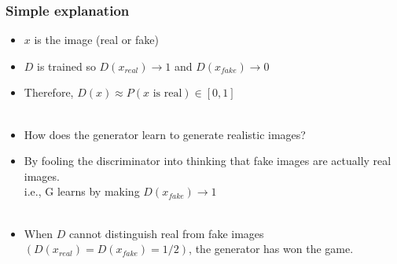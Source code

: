 \documentclass[t]{beamer}
\begin{document}

\begin{frame}
\frametitle{Simple explanation}

\begin{itemize}
	\item $x$ is the image (real or fake)
	\item $D$ is trained so $D(x_{real}) \to 1$ and $D(x_{fake}) \to 0$
	\item Therefore, $D(x) \approx P(x \text{ is real}) \in [0,1]$ \\~\\
	\item How does the generator learn to generate realistic images? 
	\item By fooling the discriminator into thinking that fake images are actually real images. \\ i.e., G learns by making $D(x_{fake}) \to 1$ \\~\\
	\item When $D$ cannot distinguish real from fake images $(D(x_{real})=D(x_{fake})=1/2)$, the generator has won the game.
\end{itemize}

\end{frame}

\end{document}
